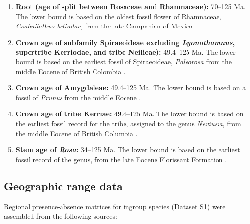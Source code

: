\begin{enumerate}
\item \textbf{Root (age of split between Rosaceae and Rhamnaceae):}
  70--125 Ma. The lower bound is based on the oldest fossil flower
  of Rhamnaceae, \textit{Coahuilathus belindae}, from the late
  Campanian of Mexico \citep{Calvillo-Canadell2007}.

\item \textbf{Crown age of subfamily Spiraeoideae excluding
    \textit{Lyonothamnus}, supertribe Kerriodae, and tribe Neilieae):}
  49.4--125 Ma. The lower bound is based on the earliest fossil of
  Spiraeoideae, \textit{Paleorosa} from the middle Eocene of British
  Colombia \citep{Basinger1976}.

\item \textbf{Crown age of Amygdaleae:} 49.4--125 Ma. The lower
  bound is based on a fossil of \textit{Prunus} from the middle Eocene
  \citep{DeVore2007}.

\item \textbf{Crown age of tribe Kerriae:} 49.4--125 Ma. The lower
  bound is based on the earliest fossil record for the tribe, assigned
  to the genus \textit{Neviusia}, from the middle Eocene of British
  Columbia \citep{DeVore2004}.

\item \textbf{Stem age of \textit{Rosa}:} 34--125 Ma. The lower bound
  is based on the earliest fossil record of the genus, from the late
  Eocene Florissant Formation \citep{Manchester2001}.
\end{enumerate}

\subsection*{Geographic range data}

Regional presence-absence matrices for ingroup species (Dataset S1)
were assembled from the following sources:


